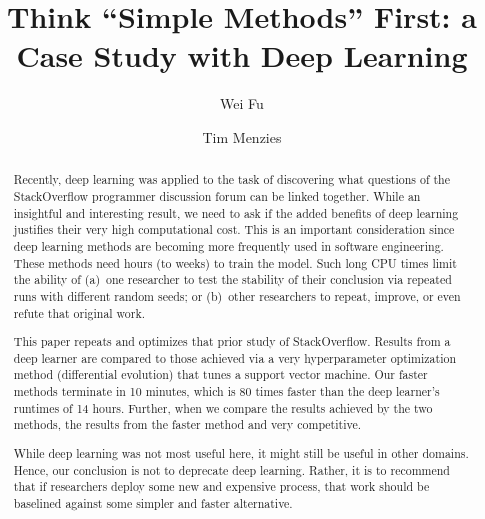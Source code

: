 \documentclass[sigconf,review, anonymous]{acmart}
\theoremstyle{break}
\begin{document}
\title{Think ``Simple Methods'' First: a Case
Study with Deep Learning}


\author{Wei Fu}

\author{Tim Menzies}
 

\begin{abstract}
Recently,  
deep learning was  applied
to the task of discovering
what questions  of the StackOverflow programmer discussion
forum can be linked together. While an insightful and interesting
result, we need to ask if the  
added benefits of deep learning 
justifies their very high computational cost.
This is an important consideration
since  deep learning methods
are
becoming more frequently
used in software engineering. These methods
need hours (to  weeks) to train the model.
Such long CPU times limit the ability
of (a)~one researcher to test
the stability of their conclusion
via repeated runs with different random seeds;
or (b)~other researchers to repeat, improve, or even refute that original work.

This paper repeats and optimizes that prior
study of StackOverflow. Results from  a  deep learner  
are compared to those achieved via a very hyperparameter
optimization method (differential evolution)
that tunes a support vector machine.
Our faster 
methods terminate in 10 minutes, which is 80 times faster
than the deep learner's runtimes of 14 hours.
Further, when we compare the results
achieved by the two methods,  the  results from the faster method and  very competitive.


While   deep learning  was not most useful
here, it might still be useful in other domains.
Hence, our conclusion is not
to deprecate deep learning.
Rather, it is
to recommend that if researchers
deploy some new and expensive
process, that work should be 
baselined against some simpler and faster
alternative.
\end{abstract}
\end{document}
